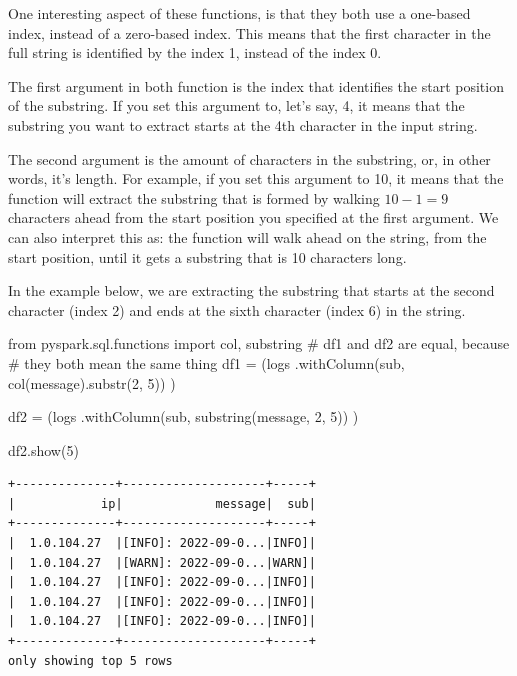 \documentclass[
  11pt,
  letterpaper,
  DIV=11,
  numbers=noendperiod]{scrreprt}
\newenvironment{Shaded}{\begin{snugshade}}{\end{snugshade}}
\newcommand{\CommentTok}[1]{\textcolor[rgb]{0.37,0.37,0.37}{#1}}
\newcommand{\DecValTok}[1]{\textcolor[rgb]{0.68,0.00,0.00}{#1}}
\newcommand{\ImportTok}[1]{\textcolor[rgb]{0.00,0.46,0.62}{#1}}
\newcommand{\NormalTok}[1]{\textcolor[rgb]{0.00,0.23,0.31}{#1}}
\newcommand{\OperatorTok}[1]{\textcolor[rgb]{0.37,0.37,0.37}{#1}}
\newcommand{\StringTok}[1]{\textcolor[rgb]{0.13,0.47,0.30}{#1}}
\begin{document}
One interesting aspect of these functions, is that they both use a
one-based index, instead of a zero-based index. This means that the
first character in the full string is identified by the index 1, instead
of the index 0.

The first argument in both function is the index that identifies the
start position of the substring. If you set this argument to, let's say,
4, it means that the substring you want to extract starts at the 4th
character in the input string.

The second argument is the amount of characters in the substring, or, in
other words, it's length. For example, if you set this argument to 10,
it means that the function will extract the substring that is formed by
walking \(10 - 1 = 9\) characters ahead from the start position you
specified at the first argument. We can also interpret this as: the
function will walk ahead on the string, from the start position, until
it gets a substring that is 10 characters long.

In the example below, we are extracting the substring that starts at the
second character (index 2) and ends at the sixth character (index 6) in
the string.

\begin{Shaded}
\begin{Highlighting}[]
\ImportTok{from}\NormalTok{ pyspark.sql.functions }\ImportTok{import}\NormalTok{ col, substring}
\CommentTok{\# \textasciigrave{}df1\textasciigrave{} and \textasciigrave{}df2\textasciigrave{} are equal, because}
\CommentTok{\# they both mean the same thing}
\NormalTok{df1 }\OperatorTok{=}\NormalTok{ (logs}
\NormalTok{    .withColumn(}\StringTok{\textquotesingle{}sub\textquotesingle{}}\NormalTok{, col(}\StringTok{\textquotesingle{}message\textquotesingle{}}\NormalTok{).substr(}\DecValTok{2}\NormalTok{, }\DecValTok{5}\NormalTok{))}
\NormalTok{)}

\NormalTok{df2 }\OperatorTok{=}\NormalTok{ (logs}
\NormalTok{    .withColumn(}\StringTok{\textquotesingle{}sub\textquotesingle{}}\NormalTok{, substring(}\StringTok{\textquotesingle{}message\textquotesingle{}}\NormalTok{, }\DecValTok{2}\NormalTok{, }\DecValTok{5}\NormalTok{))}
\NormalTok{)}

\NormalTok{df2.show(}\DecValTok{5}\NormalTok{)}
\end{Highlighting}
\end{Shaded}

\begin{verbatim}
+--------------+--------------------+-----+
|            ip|             message|  sub|
+--------------+--------------------+-----+
|  1.0.104.27  |[INFO]: 2022-09-0...|INFO]|
|  1.0.104.27  |[WARN]: 2022-09-0...|WARN]|
|  1.0.104.27  |[INFO]: 2022-09-0...|INFO]|
|  1.0.104.27  |[INFO]: 2022-09-0...|INFO]|
|  1.0.104.27  |[INFO]: 2022-09-0...|INFO]|
+--------------+--------------------+-----+
only showing top 5 rows
\end{verbatim}
\end{document}
